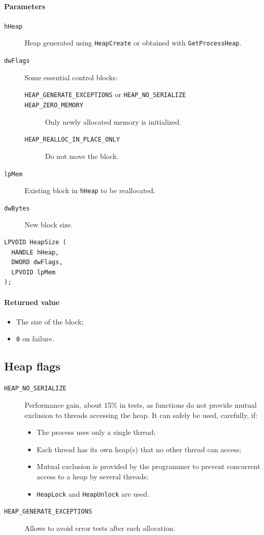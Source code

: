 \paragraph{Parameters}
\begin{description}
\item [\texttt{hHeap}] Heap generated using \texttt{HeapCreate} or obtained with \texttt{GetProcessHeap}.
\item [\texttt{dwFlags}] Some essential control blocks:
\begin{description}
\item [\texttt{HEAP\_GENERATE\_EXCEPTIONS} or \texttt{HEAP\_NO\_SERIALIZE}]
\item [\texttt{HEAP\_ZERO\_MEMORY}] Only newly allocated memory is initialized.
\item [\texttt{HEAP\_REALLOC\_IN\_PLACE\_ONLY}] Do not move the block.
\end{description}
\item [\texttt{lpMem}] Existing block in \texttt{hHeap} to be reallocated.
\item [\texttt{dwBytes}] New block size.
\end{description}

\begin{verbatim}
LPVOID HeapSize (
  HANDLE hHeap,
  DWORD dwFlags,
  LPVOID lpMem
);
\end{verbatim}

\paragraph{Returned value}
\begin{itemize}
\item The size of the block;
\item \texttt{0} on failure.
\end{itemize}

\subsection{Heap flags}
\begin{description}
\item [\texttt{HEAP\_NO\_SERIALIZE}] Performance gain, about 15\% in tests, as functions do not provide mutual exclusion to threads accessing the heap. It can safely be used, carefully, if:
\begin{itemize}
\item The process uses only a single thread;
\item Each thread has its own heap(s) that no other thread can access;
\item Mutual exclusion is provided by the programmer to prevent concurrent access to a heap by several threads;
\item \texttt{HeapLock} and \texttt{HeapUnlock} are used.
\end{itemize}
\item [\texttt{HEAP\_GENERATE\_EXCEPTIONS}] Allows to avoid error tests after each allocation.
\end{description}

